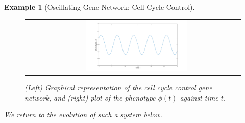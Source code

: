 \documentclass{article}
\newcommand{\plr}[1]{\todo[color=blue!25]{#1}}
\newcommand{\plr}[1]{{\color{blue}\it #1}}
\newcommand{\1}{\mathbbm{1}}
\newtheorem{example}{Example}
\begin{document}
\begin{example}[Oscillating Gene Network: Cell Cycle Control]
\begin{figure}[H]
\begin{tabular}{cc}
\begin{tikzpicture}
            \end{tikzpicture} &
      \includegraphics[width=0.5\textwidth, height=0.25\paperheight]{osc_impulse}
   \end{tabular}
      \caption{(Left) Graphical representation of the cell cycle control gene network, and (right) plot of the phenotype $\phi(t)$ against time $t$.}
    \end{figure}
      We return to the evolution of such a system below.
  \end{example}
\end{document}
